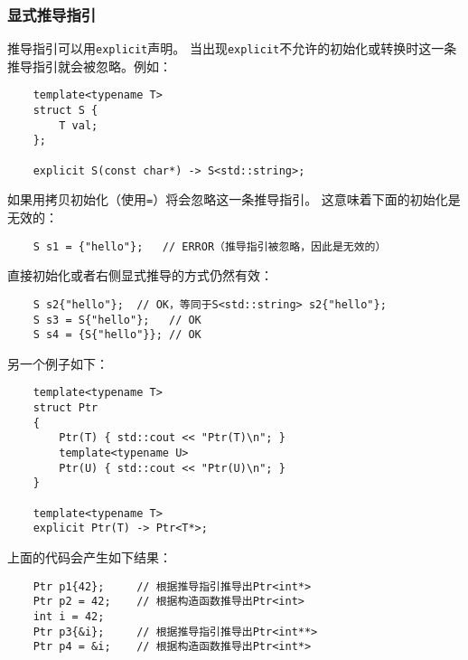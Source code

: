 \subsubsection{显式推导指引}
推导指引可以用\texttt{explicit}声明。
当出现\texttt{explicit}不允许的初始化或转换时这一条推导指引就会被忽略。例如：
\begin{lstlisting}
    template<typename T>
    struct S {
        T val;
    };

    explicit S(const char*) -> S<std::string>;
\end{lstlisting}
如果用拷贝初始化（使用\texttt{=}）将会忽略这一条推导指引。
这意味着下面的初始化是无效的：
\begin{lstlisting}
    S s1 = {"hello"};   // ERROR（推导指引被忽略，因此是无效的）
\end{lstlisting}
直接初始化或者右侧显式推导的方式仍然有效：
\begin{lstlisting}
    S s2{"hello"};  // OK，等同于S<std::string> s2{"hello"};
    S s3 = S{"hello"};   // OK
    S s4 = {S{"hello"}}; // OK
\end{lstlisting}
另一个例子如下：
\begin{lstlisting}
    template<typename T>
    struct Ptr
    {
        Ptr(T) { std::cout << "Ptr(T)\n"; }
        template<typename U>
        Ptr(U) { std::cout << "Ptr(U)\n"; }
    }

    template<typename T>
    explicit Ptr(T) -> Ptr<T*>;
\end{lstlisting}
上面的代码会产生如下结果：
\begin{lstlisting}
    Ptr p1{42};     // 根据推导指引推导出Ptr<int*>
    Ptr p2 = 42;    // 根据构造函数推导出Ptr<int>
    int i = 42;
    Ptr p3{&i};     // 根据推导指引推导出Ptr<int**>
    Ptr p4 = &i;    // 根据构造函数推导出Ptr<int*>
\end{lstlisting}

